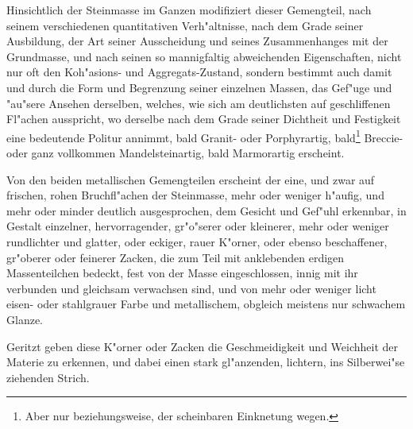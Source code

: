\documentclass[a4paper, 11pt, oneside, german]{article}
\begin{document}
Hinsichtlich der Steinmasse im Ganzen modifiziert dieser Gemengteil, nach seinem verschiedenen quantitativen Verh"altnisse, nach dem Grade seiner Ausbildung, der Art seiner Ausscheidung und seines Zusammenhanges mit der Grundmasse, und nach seinen so mannigfaltig abweichenden Eigenschaften, nicht nur oft den Koh"asions- und Aggregats-Zustand, sondern bestimmt auch damit und durch die Form und Begrenzung seiner einzelnen Massen, das Gef"uge und "au"sere Ansehen derselben, welches, wie sich am deutlichsten auf geschliffenen Fl"achen ausspricht, wo derselbe nach dem Grade seiner Dichtheit und Festigkeit eine bedeutende Politur annimmt, bald Granit- oder Porphyrartig, bald\footnote{Aber nur beziehungsweise, der scheinbaren Einknetung wegen.} Breccie- oder ganz vollkommen Mandelsteinartig, bald Marmorartig erscheint.

Von den beiden metallischen Gemengteilen erscheint der eine, und zwar auf frischen, rohen Bruchfl"achen der Steinmasse, mehr oder weniger h"aufig, und mehr oder minder deutlich ausgesprochen, dem Gesicht und Gef"uhl erkennbar, in Gestalt einzelner, hervorragender, gr"o"serer oder kleinerer, mehr oder weniger rundlichter und glatter, oder eckiger, rauer K"orner, oder ebenso beschaffener, gr"oberer oder feinerer Zacken, die zum Teil mit anklebenden erdigen Massenteilchen bedeckt, fest von der Masse eingeschlossen, innig mit ihr verbunden und gleichsam verwachsen sind, und von mehr oder weniger licht eisen- oder stahlgrauer Farbe und metallischem, obgleich meistens nur schwachem Glanze.

Geritzt geben diese K"orner oder Zacken die Geschmeidigkeit und Weichheit der Materie zu erkennen, und dabei einen stark gl"anzenden, lichtern, ins Silberwei"se ziehenden Strich.
\end{document}
